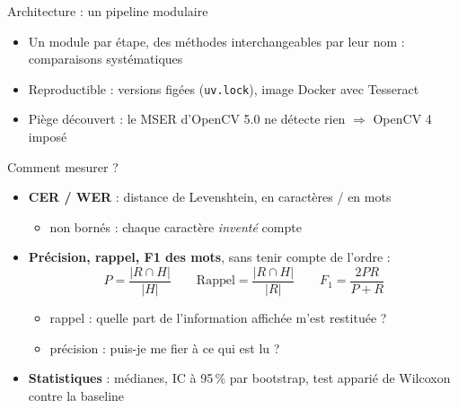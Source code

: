 \documentclass[aspectratio=169,11pt]{beamer}
\begin{document}
\begin{frame}{Architecture : un pipeline modulaire}
\centering
{}
\vfill
\begin{itemize}
\item Un module par étape, des méthodes \alert{interchangeables par leur nom} : comparaisons systématiques
\item Reproductible : versions figées (\texttt{uv.lock}), image Docker avec Tesseract
\item Piège découvert : le MSER d'OpenCV 5.0 ne détecte \alert{rien} $\Rightarrow$ OpenCV 4 imposé
\end{itemize}
\end{frame}

\begin{frame}{Comment mesurer ?}
\begin{itemize}
\item \textbf{CER / WER} : distance de Levenshtein, en caractères / en mots
  \begin{itemize}\item non bornés : chaque caractère \emph{inventé} compte\end{itemize}
\item \textbf{Précision, rappel, F1 des mots}, sans tenir compte de l'ordre :
\[ P = \frac{|R\cap H|}{|H|}\qquad \text{Rappel} = \frac{|R\cap H|}{|R|}\qquad F_1=\frac{2PR}{P+R} \]
  \begin{itemize}
  \item \alert{rappel} : quelle part de l'information affichée m'est restituée ?
  \item \alert{précision} : puis-je me fier à ce qui est lu ?
  \end{itemize}
\item \textbf{Statistiques} : médianes, IC à 95\,\% par bootstrap, test apparié de Wilcoxon contre la baseline
\end{itemize}
\end{frame}
\end{document}
